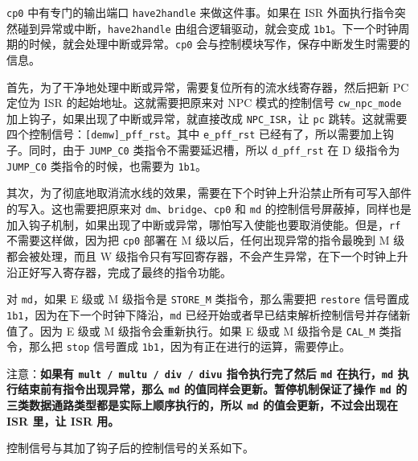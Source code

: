 \documentclass[12pt,AutoFakeBold,AutoFakeSlant]{article}
\begin{document}
\texttt{cp0} 中有专门的输出端口 \texttt{have2handle} 来做这件事。如果在
ISR 外面执行指令突然碰到异常或中断，\texttt{have2handle}
由组合逻辑驱动，就会变成
\texttt{1\textquotesingle{}b1}。下一个时钟周期的时候，就会处理中断或异常。\texttt{cp0}
会与控制模块写作，保存中断发生时需要的信息。

首先，为了干净地处理中断或异常，需要复位所有的流水线寄存器，然后把新 PC
定位为 ISR 的起始地址。这就需要把原来对 NPC 模式的控制信号
\texttt{cw\_npc\_mode} 加上钩子，如果出现了中断或异常，就直接改成
\texttt{NPC\_ISR}，让 \texttt{pc}
跳转。这就需要四个控制信号：\texttt{{[}demw{]}\_pff\_rst}。其中
\texttt{e\_pff\_rst} 已经有了，所以需要加上钩子。同时，由于
\texttt{JUMP\_C0} 类指令不需要延迟槽，所以 \texttt{d\_pff\_rst} 在 D
级指令为 \texttt{JUMP\_C0} 类指令的时候，也需要为
\texttt{1\textquotesingle{}b1}。

其次，为了彻底地取消流水线的效果，需要在下个时钟上升沿禁止所有可写入部件的写入。这也需要把原来对
\texttt{dm}、\texttt{bridge}、\texttt{cp0} 和 \texttt{md}
的控制信号屏蔽掉，同样也是加入钩子机制，如果出现了中断或异常，哪怕写入使能也要取消使能。但是，\texttt{rf}
不需要这样做，因为把 \texttt{cp0} 部署在 M
级以后，任何出现异常的指令最晚到 M 级都会被处理，而且 W
级指令只有写回寄存器，不会产生异常，在下一个时钟上升沿正好写入寄存器，完成了最终的指令功能。

对 \texttt{md}，如果 E 级或 M 级指令是 \texttt{STORE\_M}
类指令，那么需要把 \texttt{restore} 信号置成
\texttt{1\textquotesingle{}b1}，因为在下一个时钟下降沿，\texttt{md}
已经开始或者早已结束解析控制信号并存储新值了。因为 E 级或 M
级指令会重新执行。如果 E 级或 M 级指令是 \texttt{CAL\_M} 类指令，那么把
\texttt{stop} 信号置成
\texttt{1\textquotesingle{}b1}，因为有正在进行的运算，需要停止。

注意：\textbf{如果有 \texttt{mult\ /\ multu\ /\ div\ /\ divu}
指令执行完了然后 \texttt{md} 在执行，\texttt{md}
执行结束前有指令出现异常，那么 \texttt{md}
的值同样会更新。暂停机制保证了操作 \texttt{md}
的三类数据通路类型都是实际上顺序执行的，所以 \texttt{md}
的值会更新，不过会出现在 ISR 里，让 ISR 用。}

控制信号与其加了钩子后的控制信号的关系如下。
\end{document}
